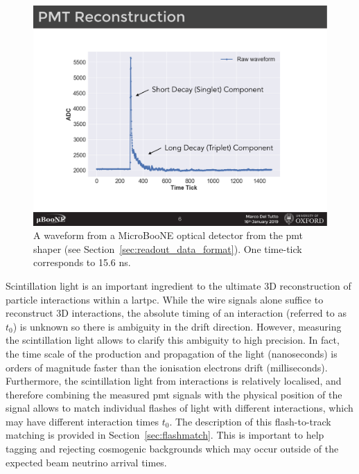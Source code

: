 \begin{figure}[]
\centering
\includegraphics[width=.70\textwidth]{images/MicroBooNE/raw_wf}
\caption[MicroBooNE Optical Waveform]{A waveform from a MicroBooNE optical detector from the \acrshort{pmt} shaper (see Section~\ref{sec:readout_data_format}). One time-tick corresponds to 15.6 ns.}
\label{fig:raw_wf}
\end{figure}

Scintillation light is an important ingredient to the ultimate 3D reconstruction of particle interactions within a \acrshort{lartpc}. While the wire signals alone suffice to reconstruct 3D interactions, the absolute timing of an interaction (referred to as $t_0$) is unknown so there is ambiguity in the drift direction. However, measuring the scintillation light allows to clarify this ambiguity to high precision. In fact, the time scale of the production and propagation of the light (nanoseconds) is orders of magnitude faster than the ionisation electrons drift (milliseconds). Furthermore, the scintillation light from interactions is relatively localised, and therefore combining the measured \acrshort{pmt} signals with the physical position of the signal allows to match individual flashes of light with different interactions, which may have different interaction times $t_0$. The description of this flash-to-track matching is provided in Section~\ref{sec:flashmatch}. This is important to help tagging and rejecting cosmogenic backgrounds which may occur outside of the expected beam neutrino arrival times.

